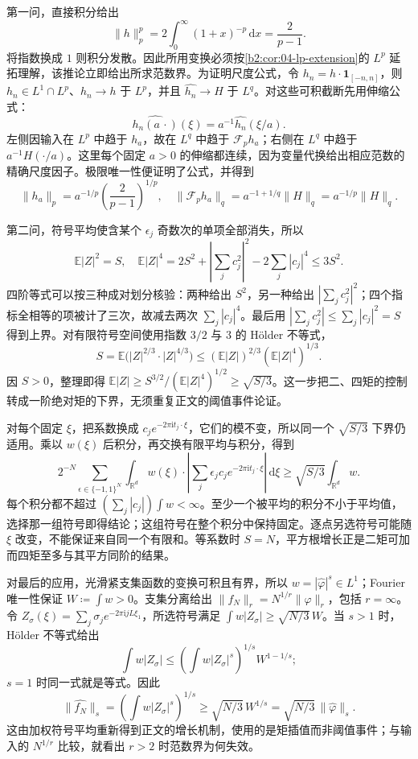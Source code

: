 \begin{solution}
第一问，直接积分给出
\[
 \|h\|_p^p=2\int_0^\infty(1+x)^{-p}\,\mathrm dx=\frac2{p-1}.
\]
将指数换成 \(1\) 则积分发散。因此所用变换必须按\cref{b2:cor:04-lp-extension}的 \(L^p\) 延拓理解，该推论立即给出所求范数界。为证明尺度公式，令 \(h_n=h\cdot\mathbf1_{[-n,n]}\)，则 \(h_n\in L^1\cap L^p\)、\(h_n\to h\) 于 \(L^p\)，并且 \(\widehat{h_n}\to H\) 于 \(L^q\)。对这些可积截断先用伸缩公式：
\[
 \widehat{h_n(a\,\cdot)}(\xi)=a^{-1}\widehat{h_n}(\xi/a).
\]
左侧因输入在 \(L^p\) 中趋于 \(h_a\)，故在 \(L^q\) 中趋于 \(\mathcal F_ph_a\)；右侧在 \(L^q\) 中趋于 \(a^{-1}H(\cdot/a)\)。这里每个固定 \(a>0\) 的伸缩都连续，因为变量代换给出相应范数的精确尺度因子。极限唯一性便证明了公式，并得到
\[
 \|h_a\|_p=a^{-1/p}\left(\frac2{p-1}\right)^{1/p},
 \quad
 \|\mathcal F_ph_a\|_q
 =a^{-1+1/q}\|H\|_q=a^{-1/p}\|H\|_q.
\]

第二问，符号平均使含某个 \(\epsilon_j\) 奇数次的单项全部消失，所以
\[
 \mathbb E|Z|^2=S,
 \quad
 \mathbb E|Z|^4
 =2S^2+\left|\sum_jc_j^2\right|^2-2\sum_j|c_j|^4
 \leq3S^2.
\]
四阶等式可以按三种成对划分核验：两种给出 \(S^2\)，另一种给出 \(|\sum_jc_j^2|^2\)；四个指标全相等的项被计了三次，故减去两次 \(\sum_j|c_j|^4\)。最后用 \(|\sum_jc_j^2|\leq\sum_j|c_j|^2=S\) 得到上界。对有限符号空间使用指数 \(3/2\) 与 \(3\) 的 Hölder 不等式，
\[
 S=\mathbb E\bigl(|Z|^{2/3}\cdot|Z|^{4/3}\bigr)
 \leq(\mathbb E|Z|)^{2/3}(\mathbb E|Z|^4)^{1/3}.
\]
因 \(S>0\)，整理即得 \(\mathbb E|Z|\geq S^{3/2}/(\mathbb E|Z|^4)^{1/2}\geq\sqrt{S/3}\)。这一步把二、四矩的控制转成一阶绝对矩的下界，无须重复正文的阈值事件论证。

对每个固定 \(\xi\)，把系数换成 \(c_je^{-2\pi\mathrm i t_j\cdot\xi}\)，它们的模不变，所以同一个 \(\sqrt{S/3}\) 下界仍适用。乘以 \(w(\xi)\) 后积分，再交换有限平均与积分，得到
\[
 2^{-N}\sum_{\epsilon\in\{-1,1\}^N}
 \int_{\mathbb R^d}w(\xi)\cdot
 \left|\sum_j\epsilon_jc_je^{-2\pi\mathrm i t_j\cdot\xi}\right|\,\mathrm d\xi
 \geq\sqrt{S/3}\int_{\mathbb R^d}w.
\]
每个积分都不超过 \((\sum_j|c_j|)\int w<\infty\)。至少一个被平均的积分不小于平均值，选择那一组符号即得结论；这组符号在整个积分中保持固定。逐点另选符号可能随 \(\xi\) 改变，不能保证来自同一个有限和。等系数时 \(S=N\)，平方根增长正是二矩可加而四矩至多与其平方同阶的结果。

对最后的应用，光滑紧支集函数的变换可积且有界，所以 \(w=|\widehat\varphi|^s\in L^1\)；Fourier 唯一性保证 \(W\coloneqq\int w>0\)。支集分离给出 \(\|f_N\|_r=N^{1/r}\|\varphi\|_r\)，包括 \(r=\infty\)。令 \(Z_\sigma(\xi)=\sum_j\sigma_je^{-2\pi\mathrm i jL\xi_1}\)，所选符号满足 \(\int w|Z_\sigma|\geq\sqrt{N/3}\,W\)。当 \(s>1\) 时，Hölder 不等式给出
\[
 \int w|Z_\sigma|
 \leq\left(\int w|Z_\sigma|^s\right)^{1/s}W^{1-1/s};
\]
\(s=1\) 时同一式就是等式。因此
\[
 \|\widehat {f_N}\|_s
 =\left(\int w|Z_\sigma|^s\right)^{1/s}
 \geq\sqrt{N/3}\,W^{1/s}
 =\sqrt{N/3}\,\|\widehat\varphi\|_s.
\]
这由加权符号平均重新得到正文的增长机制，使用的是矩插值而非阈值事件；与输入的 \(N^{1/r}\) 比较，就看出 \(r>2\) 时范数界为何失效。
\end{solution}
